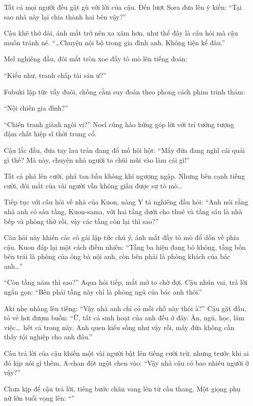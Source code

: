 \documentclass[../main.tex]{subfiles}
\begin{document}
Tất cả mọi người đều gật gù với lời của cậu. Đến lượt Sora đưa lên ý kiến: ``Tại sao nhà này lại chia thành hai bên vậy?''

Cậu khẽ thở dài, ánh mắt trở nên xa xăm hơn, như thể đây là câu hỏi mà cậu muốn tránh né. ``\dots Chuyện nội bộ trong gia đình anh. Không tiện kể đâu.''

Mel nghiêng đầu, đôi mắt tròn xoe đầy tò mò lên tiếng đoán:

``Kiểu như, tranh chấp tài sản ư?''

Fubuki lập tức vẫy đuôi, chống cằm suy đoán theo phong cách phim trinh thám:

``Nội chiến gia đình?''

``Chiến tranh giành ngôi vị?'' Noel cũng hào hứng góp lời với trí tưởng tượng đậm chất hiệp sĩ thời trung cổ.

Cậu lắc đầu, đưa tay lau trán đang đổ mồ hôi hột: ``Mấy đứa đang nghĩ cái quái gì thế? Mà này, chuyện nhà người ta chúi mũi vào làm cái gì!''

Tất cả phá lên cười, phá tan bầu không khí ngượng ngập. Nhưng bên cạnh tiếng cười, đôi mắt của vài người vẫn không giấu được sự tò mò\dots

Tiếp tục với câu hỏi về nhà của Kuon, nàng Y tá nghiêng đầu hỏi: ``Anh nói rằng nhà anh có sáu tầng, Kuon-sama, với hai tầng dưới cho thuê và tầng sáu là nhà bếp và phòng thờ rồi, vậy các tầng còn lại thì sao?''

Câu hỏi này khiến các cô gái lập tức chú ý, ánh mắt đầy tò mò đổ dồn về phía cậu. Kuon đáp lại một cách điềm nhiên: ``Tầng ba hiện đang bỏ không, tầng bốn bên trái là phòng của ông bà nội anh, còn bên phải là phòng khách của bác anh\dots''

``Còn tầng năm thì sao?'' Aqua hỏi tiếp, mắt mở to chờ đợi. Cậu nhún vai, trả lời ngắn gọn: ``Bên phải tầng này chỉ là phòng ngủ của bác anh thôi.''

Aki nhẹ nhàng lên tiếng: ``Vậy nhà anh chỉ có mỗi chỗ này thôi à?'' Cậu gật đầu, tỏ vẻ hơi đượm buồn: ``Ừ, tất cả sinh hoạt của anh đều ở đây. Ăn, ngủ, học, làm việc\dots\ hết cả trong này. Anh quen kiểu sống như vậy rồi, mấy đứa không cần thấy tội nghiệp cho anh đâu.''

Câu trả lời của cậu khiến một vài người bật lên tiếng cười trừ, nhưng trước khi ai đó kịp nói gì thêm, A-chan đột ngột chen vào: ``Vậy nhà cậu có bao nhiêu người ở vậy?''

Chưa kịp để cậu trả lời, tiếng bước chân vang lên từ cầu thang. Một giọng phụ nữ lớn tuổi vọng lên: ``''
\end{document}
